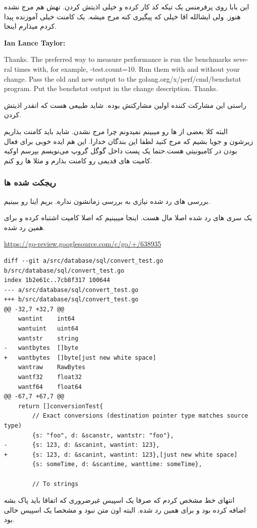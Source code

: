 این بابا روی پرفرمنس یک تیکه کد کار کرده و خیلی اذیتش کردن. تهش هم مرج نشده هنوز. ولی ایشالله اقا خیلی که پیگیری کنه مرج میشه.
یک کامنت خیلی آموزنده پیدا کردم میذارم اینجا. 
\begin{latin}
\textbf{Ian Lance Taylor:}

Thanks. The preferred way to measure performance is run the benchmarks several times with, for example, -test.count=10. Run them with and without your change. Pass the old and new output to the golang.org/x/perf/cmd/benchstat program. Put the benchstat output in the change description. Thanks.
\end{latin}
راستی این مشارکت کننده اولین مشارکتش بوده. شاید طبیعی هست که انقدر اذیتش کردن.

البته کلا بعضی از \cl ها رو میبینم نمیدونم چرا مرج نشدن. شاید باید کامنت بذاریم زیرشون و جویا بشیم که مرج کنید لطفا این بندگان خدارا.
این هم ایده خوبی برای فعال بودن در کامیونیتی هست.حتما یک پست داخل گوگل گروپ می‌نویسم بپرسم اوکیه کامیت های قدیمی رو کامنت بذارم
و مثلا  ها رو  کنم.

\subsubsection{ریجکت شده ها}
بررسی  های رد شده نیازی به بررسی زمانشون نداره. بریم اینا رو ببینیم.

یک سری  های رد شده اصلا مال  هست. 
اینجا میبینیم که اصلا  کامیت اشتباه کرده و برای همین رد شده.
\begin{latin}
\url{https://go-review.googlesource.com/c/go/+/638935}

\begin{verbatim}
diff --git a/src/database/sql/convert_test.go b/src/database/sql/convert_test.go
index 1b2e61c..7cb8f317 100644
--- a/src/database/sql/convert_test.go
+++ b/src/database/sql/convert_test.go
@@ -32,7 +32,7 @@
    wantint    int64
    wantuint   uint64
    wantstr    string
-   wantbytes  []byte
+   wantbytes  []byte[just new white space]
    wantraw    RawBytes
    wantf32    float32
    wantf64    float64
@@ -67,7 +67,7 @@
    return []conversionTest{
        // Exact conversions (destination pointer type matches source type)
        {s: "foo", d: &scanstr, wantstr: "foo"},
-       {s: 123, d: &scanint, wantint: 123},
+       {s: 123, d: &scanint, wantint: 123},[just new white space]
        {s: someTime, d: &scantime, wanttime: someTime},
 
        // To strings
\end{verbatim}
\end{latin}
انتهای خط مشخص کردم که صرفا یک اسپیس غیرضروری که اتفاقا باید پاک بشه اضافه کرده بود و برای همین رد شده. البته اون متن نبود و مشخصا
یک اسپیس خالی بود.

